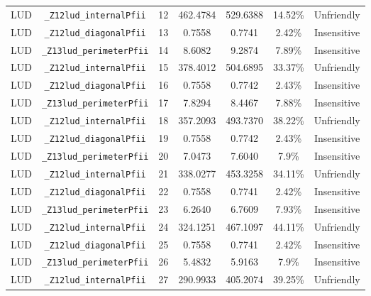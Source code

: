 \documentclass{article}
\begin{document}
\begin{table}[H]
\begin{tabular}{c c c c c c c}
		LUD       & \verb|_Z12lud_internalPfii|                    & 12  & 462.4784 & 529.6388      & 14.52\%     & Unfriendly  \\
		LUD       & \verb|_Z12lud_diagonalPfii|                    & 13  & 0.7558   & 0.7741        & 2.42\%      & Insensitive \\
		LUD       & \verb|_Z13lud_perimeterPfii|                   & 14  & 8.6082   & 9.2874        & 7.89\%      & Insensitive \\
		LUD       & \verb|_Z12lud_internalPfii|                    & 15  & 378.4012 & 504.6895      & 33.37\%     & Unfriendly  \\
		LUD       & \verb|_Z12lud_diagonalPfii|                    & 16  & 0.7558   & 0.7742        & 2.43\%      & Insensitive \\
		LUD       & \verb|_Z13lud_perimeterPfii|                   & 17  & 7.8294   & 8.4467        & 7.88\%      & Insensitive \\
		LUD       & \verb|_Z12lud_internalPfii|                    & 18  & 357.2093 & 493.7370      & 38.22\%     & Unfriendly  \\
		LUD       & \verb|_Z12lud_diagonalPfii|                    & 19  & 0.7558   & 0.7742        & 2.43\%      & Insensitive \\
		LUD       & \verb|_Z13lud_perimeterPfii|                   & 20  & 7.0473   & 7.6040        & 7.9\%       & Insensitive \\
		LUD       & \verb|_Z12lud_internalPfii|                    & 21  & 338.0277 & 453.3258      & 34.11\%     & Unfriendly  \\
		LUD       & \verb|_Z12lud_diagonalPfii|                    & 22  & 0.7558   & 0.7741        & 2.42\%      & Insensitive \\
		LUD       & \verb|_Z13lud_perimeterPfii|                   & 23  & 6.2640   & 6.7609        & 7.93\%      & Insensitive \\
		LUD       & \verb|_Z12lud_internalPfii|                    & 24  & 324.1251 & 467.1097      & 44.11\%     & Unfriendly  \\
		LUD       & \verb|_Z12lud_diagonalPfii|                    & 25  & 0.7558   & 0.7741        & 2.42\%      & Insensitive \\
		LUD       & \verb|_Z13lud_perimeterPfii|                   & 26  & 5.4832   & 5.9163        & 7.9\%       & Insensitive \\
		LUD       & \verb|_Z12lud_internalPfii|                    & 27  & 290.9933 & 405.2074      & 39.25\%     & Unfriendly  \\

\end{tabular}
\end{table}
\end{document}

